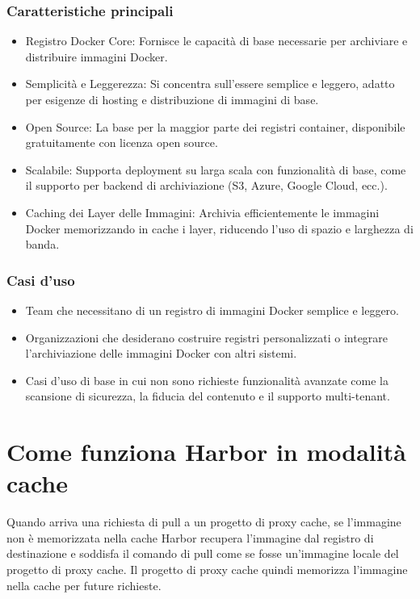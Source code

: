 \documentclass[12pt]{report}
\begin{document}
\subsubsection{Caratteristiche principali}
\begin{itemize}
  \item Registro Docker Core: Fornisce le capacità di base necessarie per archiviare e distribuire immagini Docker.
  \item Semplicità e Leggerezza: Si concentra sull'essere semplice e leggero, adatto per esigenze di hosting e distribuzione di immagini di base.
  \item Open Source: La base per la maggior parte dei registri container, disponibile gratuitamente con licenza open source.
  \item Scalabile: Supporta deployment su larga scala con funzionalità di base, come il supporto per backend di archiviazione (S3, Azure, Google Cloud, ecc.).
  \item Caching dei Layer delle Immagini: Archivia efficientemente le immagini Docker memorizzando in cache i layer, riducendo l'uso di spazio e larghezza di banda.
\end{itemize}

\subsubsection{Casi d'uso}
\begin{itemize}
  \item Team che necessitano di un registro di immagini Docker semplice e leggero.
  \item Organizzazioni che desiderano costruire registri personalizzati o integrare l'archiviazione delle immagini Docker con altri sistemi.
  \item Casi d'uso di base in cui non sono richieste funzionalità avanzate come la scansione di sicurezza, la fiducia del contenuto e il supporto multi-tenant.
\end{itemize}

\section{Come funziona Harbor in modalità cache}
Quando arriva una richiesta di pull a un progetto di proxy cache, se l'immagine non è memorizzata nella cache Harbor recupera l'immagine dal registro di destinazione e soddisfa il comando di pull come se fosse un'immagine locale del progetto di proxy cache. Il progetto di proxy cache quindi memorizza l'immagine nella cache per future richieste.
\end{document}
